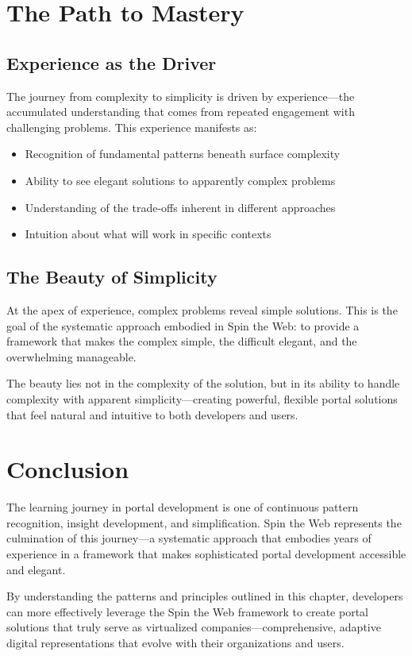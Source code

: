 \section{The Path to Mastery}

\subsection{Experience as the Driver}

The journey from complexity to simplicity is driven by experience—the accumulated understanding that comes from repeated engagement with challenging problems. This experience manifests as:

\begin{itemize}
\item Recognition of fundamental patterns beneath surface complexity
\item Ability to see elegant solutions to apparently complex problems
\item Understanding of the trade-offs inherent in different approaches
\item Intuition about what will work in specific contexts
\end{itemize}

\subsection{The Beauty of Simplicity}

At the apex of experience, complex problems reveal simple solutions. This is the goal of the systematic approach embodied in Spin the Web: to provide a framework that makes the complex simple, the difficult elegant, and the overwhelming manageable.

The beauty lies not in the complexity of the solution, but in its ability to handle complexity with apparent simplicity—creating powerful, flexible portal solutions that feel natural and intuitive to both developers and users.

\section{Conclusion}

The learning journey in portal development is one of continuous pattern recognition, insight development, and simplification. Spin the Web represents the culmination of this journey—a systematic approach that embodies years of experience in a framework that makes sophisticated portal development accessible and elegant.

By understanding the patterns and principles outlined in this chapter, developers can more effectively leverage the Spin the Web framework to create portal solutions that truly serve as virtualized companies—comprehensive, adaptive digital representations that evolve with their organizations and users.

